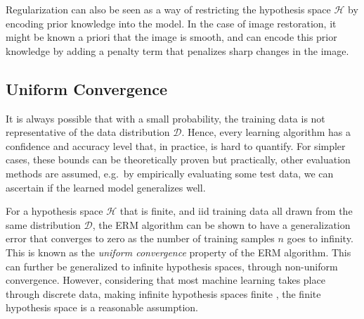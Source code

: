 Regularization can also be seen as a way of restricting the hypothesis space $\mathcal{H}$ by encoding prior knowledge into the model. In the case of image restoration, it might be known a priori that the image is smooth, and  can encode this prior knowledge by adding a penalty term that penalizes sharp changes in the image.


\subsection{Uniform Convergence}
It is always possible that with a small probability, the training data is not representative of the data distribution $\mathcal{D}$. Hence, every learning algorithm has a confidence and accuracy level that, in practice, is hard to quantify. For simpler cases, these bounds can be theoretically proven but practically, other evaluation methods are assumed, e.g.\ by empirically evaluating some test data, we can ascertain if the learned model generalizes well.

For a hypothesis space $\mathcal{H}$ that is finite, and \gls{iid} training data all drawn from the same distribution $\mathcal{D}$, the \gls{ERM} algorithm can be shown to have a generalization error that converges to zero as the number of training samples $n$ goes to infinity. This is known as the \textit{uniform convergence}  property of the \gls{ERM} algorithm. This can further be generalized to infinite  hypothesis spaces, through non-uniform  convergence. However, considering that most machine learning takes place through discrete data, making infinite  hypothesis spaces finite , the finite  hypothesis space is a reasonable assumption.
